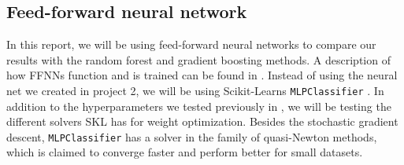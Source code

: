 \documentclass[a4paper]{article}
\newcommand\red[1]{\textcolor{red}{\textbf{#1}}}
\begin{document}
\subsection{Feed-forward neural network} \label{sec:ffnn}
In this report, we will be using feed-forward neural networks to compare our results with the random forest and gradient boosting methods. A description of how FFNNs function and is trained can be found in \cite{Github2}. Instead of using the neural net we created in project 2, we will be using Scikit-Learns \texttt{MLPClassifier} \cite{MLPClassifier}. In addition to the hyperparameters we tested previously in \cite{Github2}, we will be testing the different solvers SKL has for weight optimization. Besides the stochastic gradient descent, \texttt{MLPClassifier} has a solver in the family of quasi-Newton methods, which is claimed to converge faster and perform better for small datasets.

\end{document}
